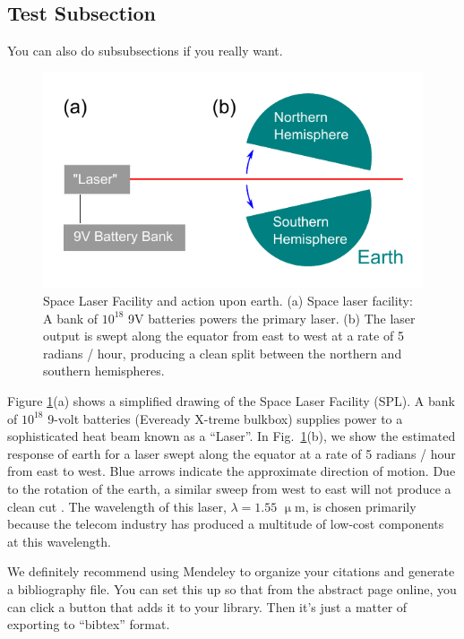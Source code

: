 \documentclass[12pt]{article}
\newcommand{\um}{$\upmu$m} %
\begin{document}
\subsection{Test Subsection}\label{sec:sub}

You can also do subsubsections if you really want. 

\begin{figure}
	\includegraphics[width=12cm]{Figures/Figure1.pdf}
	\caption{Space Laser Facility and action upon earth. (a) Space laser facility: A bank of $10^{18}$ 9V batteries powers the primary laser. (b) The laser output is swept along the equator from east to west at a rate of 5 radians / hour, producing a clean split between the northern and southern hemispheres. }
	\label{fig:laser}
\end{figure}

Figure \ref{fig:laser}(a) shows a simplified drawing of the Space Laser Facility (SPL). A bank of $10^{18}$ 9-volt batteries (Eveready \textregistered X-treme bulkbox) supplies power to a sophisticated heat beam known as a ``Laser''. In Fig.~\ref{fig:laser}(b), we show the estimated response of earth for a laser swept along the equator at a rate of 5 radians / hour from east to west. Blue arrows indicate the approximate direction of motion. Due to the rotation of the earth, a similar sweep from west to east will not produce a clean cut \cite{Sankey2010Strong}. The wavelength of this laser, $\lambda=1.55$ \um, is chosen primarily because the telecom industry has produced a multitude of low-cost components at this wavelength.



We definitely recommend using Mendeley to organize your citations and generate a bibliography file. You can set this up so that from the abstract page online, you can click a button that adds it to your library. Then it's just a matter of exporting to ``bibtex'' format.






\end{document}
